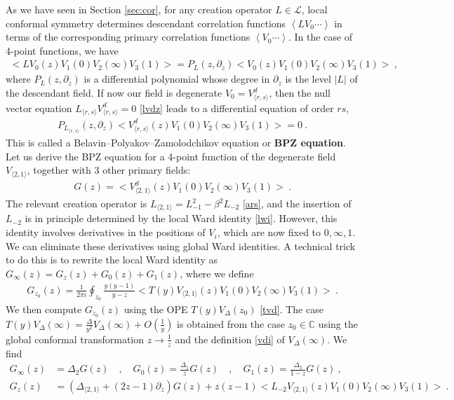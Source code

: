 \documentclass[12pt, a4paper]{article}
\newcommand{\myindex}[1]{\textbf{\boldmath #1}}
\theoremstyle{break}
\begin{document}
As we have seen in Section \ref{sec:cor}, for any creation operator $L\in\mathcal{L}$, local conformal symmetry determines descendant correlation functions $\left<LV_0\cdots \right>$ in terms of the corresponding primary correlation functions $\left<V_0\cdots \right>$.
In the case of 4-point functions, we have 
\begin{align}
 \Big<LV_0(z)V_1(0)V_2(\infty)V_3(1)\Big> = P_L(z,\partial_z) \Big<V_0(z)V_1(0)V_2(\infty)V_3(1)\Big>\ ,
\end{align}
where $P_L(z,\partial_z)$ is a differential polynomial whose degree in $\partial_z$ is the level $|L|$ of the descendant field. If now our field is degenerate $V_0= V^d_{\langle r,s\rangle}$, then the null vector equation $L_{\langle r,s\rangle}V^d_{\langle r,s\rangle}=0$ \eqref{lvdz} leads to a differential equation of order $rs$,
\begin{align}
 P_{L_{\langle r,s\rangle}}(z,\partial_z) \Big<V^d_{\langle r,s\rangle}(z)V_1(0)V_2(\infty)V_3(1)\Big> = 0\ .
\end{align}
This is called a Belavin--Polyakov--Zamolodchikov equation or \myindex{BPZ equation}.  
Let us derive the BPZ equation for a 4-point function  of the degenerate field $V_{\langle 2,1\rangle}$, together with 3 other primary fields:
\begin{align}
 G(z)=\Big<V_{\langle 2,1\rangle}^d(z)V_{1}(0)V_{2}(\infty)V_{3}(1)\Big>\ .
 \label{goz}
\end{align}
The relevant creation operator is $L_{\langle 2,1\rangle} = L_{-1}^2 -\beta^2L_{-2}$ \eqref{ars}, and the insertion of $L_{-2}$ is in principle determined by the local Ward identity \eqref{lwi}. However, this identity involves derivatives in the positions of $V_{i}$, which are now fixed to $0,\infty,1$. We can eliminate these derivatives using global Ward identities. A technical trick to do this is to rewrite the local Ward identity as $G_\infty(z) = G_{z}(z) + G_0(z) + G_1(z)$, where we define
\begin{align}
 G_{z_0}(z) = \frac{1}{2\pi i} \oint_{z_0} \frac{y(y-1)}{y-z} \Big< T(y)V_{\langle 2,1\rangle}(z)V_{1}(0)V_{2}(\infty)V_{3}(1)\Big> \ .
\end{align}
We then compute $G_{z_0}(z)$ using the OPE $T(y)V_\Delta(z_0)$ \eqref{tvd}. The case $T(y)V_\Delta(\infty) = \frac{\Delta}{y^2} V_\Delta(\infty) + O(\frac{1}{y})$ is obtained from the case $z_0\in\mathbb{C}$ using the global conformal transformation $z\to \frac{1}{z}$ and the definition \eqref{vdi} of $V_\Delta(\infty)$. We find 
\begin{align}
 G_\infty(z) &= \Delta_2 G(z) \quad , \quad G_0(z) = \frac{\Delta_1}{z}G(z)\quad , \quad G_1(z) = \frac{\Delta_3}{1-z}G(z)\ ,
 \\
 G_z(z) &= \left(\Delta_{\langle 2,1\rangle} + (2z-1)\partial_z\right) G(z) + z(z-1)\Big<L_{-2}V_{\langle 2,1\rangle}(z)V_{1}(0)V_{2}(\infty)V_{3}(1)\Big>
 \ .
\end{align}
\end{document}
